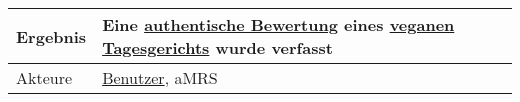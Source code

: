 \begin{table}[H]
\begin{tabularx}{\textwidth}{| l | X |}
        \hline
        Ergebnis           & Eine \hyperref[gls:authentischeBewertung]{authentische Bewertung} eines \hyperref[gls:vegan]{veganen} \hyperref[gls:tagesgericht]{Tagesgerichts} wurde verfasst                                                                                                                                                                                                                                                                                                                                                                                                                                                                                                                                                                   \\
        \hline
        Akteure            & \hyperref[gls:nutzer]{Benutzer}, \ac{aMRS}                                                                                                                                                                                                                                                                                                                                                                                                                                                                                                                                                                                                                                                                                        \\
        \hline
    \end{tabularx}
\end{table}



